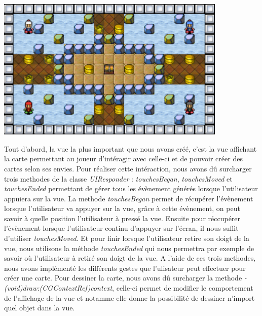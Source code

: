 		\begin{center}
			\includegraphics[width=11cm]{./Developpement/Img/carte.pdf}
		\end{center}
		Tout d'abord, la vue la plus important que nous avons créé, c'est la vue affichant la carte permettant au joueur d'intéragir avec celle-ci et de pouvoir créer des cartes selon ses envies. Pour réaliser cette intéraction, nous avons dû surcharger trois methodes de la classe \textit{UIResponder} : \textit{touchesBegan}, \textit{touchesMoved} et \textit{touchesEnded} permettant de gérer tous les évènement générés lorsque l'utilisateur appuiera sur la vue. La methode \textit{touchesBegan} permet de récupérer l'évènement lorsque l'utilisateur va appuyer sur la vue, grâce à cette évènement, on peut savoir à quelle position l'utilisateur à pressé la vue. Ensuite pour réccupérer l'évènement lorsque l'utilisateur continu d'appuyer sur l'écran, il nous suffit d'utiliser \textit{touchesMoved}. Et pour finir lorsque l'utilisateur retire son doigt de la vue, nous utilisons la méthode \textit{touchesEnded} qui nous permettra par exemple de savoir où l'utilisateur à retiré son doigt de la vue. A l'aide de ces trois methodes, nous avons implémenté les différents gestes que l'ulisateur peut effectuer pour créer une carte. Pour dessiner la carte, nous avons dû surcharger la methode \textit{- (void)draw:(CGContextRef)context}, celle-ci permet de modifier le comportement de l'affichage de la vue et notamme elle donne la possibilité de dessiner n'import quel objet dans la vue.
			
